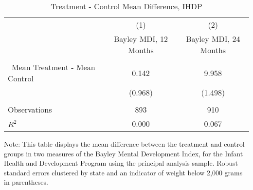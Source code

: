 \begin{table}[H] 
\begin{threeparttable}
\caption{Treatment - Control Mean Difference, IHDP}
\label{table:ihdp}
\centering 
\begin{tabular}{lcc} \toprule
 & (1) & (2) \\
 & Bayley MDI, 12 Months & Bayley MDI, 24 Months \\ \midrule
 &  &  \\\
Mean Treatment - Mean Control & 0.142 & 9.958 \\
 & (0.968) & (1.498) \\
 &  &  \\ \midrule
Observations & 893 & 910 \\
$R^2$ & 0.000 & 0.067 \\ \midrule
\end{tabular}
\begin{tablenotes}
\footnotesize
\item Note: This table displays the mean difference between the treatment and control groups in two measures of the Bayley Mental Development Index, for the Infant Health and Development Program using the principal analysis sample. Robust standard errors clustered by state and an indicator of weight below 2,000 grams in parentheses.
\end{tablenotes}
\end{threeparttable}
\end{table}
